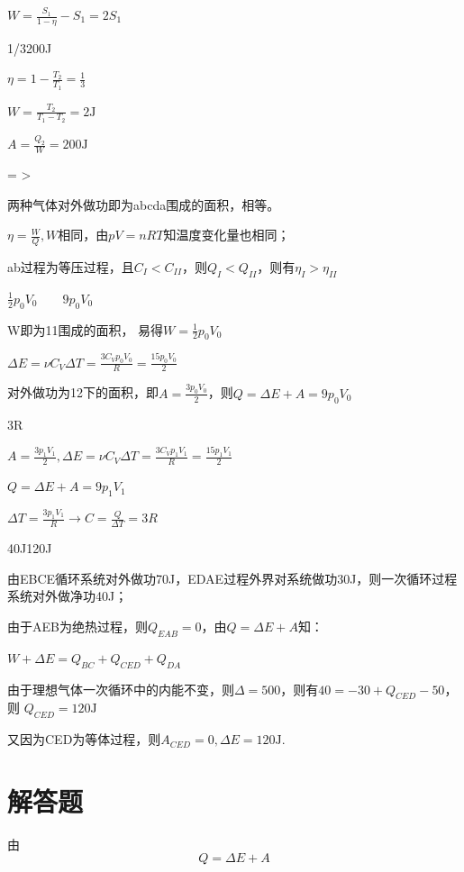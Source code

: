 \documentclass[b5paper,opensource]{./template/qyxf-book}
\begin{document}
$W=\frac{S_1}{1-\eta}-S_1=2S_1$

1/3\qquad200J

\solve
$\eta =1-\frac{T_2}{T_1}=\frac{1}{3}$

$W=\frac{T_2}{T_1-T_2}=2\mathrm{J}$

$A=\frac{Q_2}{W}=200\mathrm{J}$

= \qquad >

\solve 两种气体对外做功即为abcda围成的面积，相等。

$\eta=\frac{W}{Q},W$相同，由$pV=nRT$知温度变化量也相同；

ab过程为等压过程，且$C_{I}<C_{II}$，则$Q_{I}<Q_{II}$，则有$\eta_I>\eta_{II}$

$\frac{1}{2}p_0V_0\qquad 9p_0V_0$

\solve W即为1\to1围成的面积， 易得$W=\frac{1}{2}p_0V_0$

$\Delta E=\nu C_V\Delta T=\frac{3C_Vp_0V_0}{R}=\frac{15p_0V_0}{2}$

对外做功为1\to2下的面积，即$A=\frac{3p_0V_0}{2}$，则$Q=\Delta E+A=9p_0V_0$

3R

\solve$A=\frac{3p_1V_1}{2}, \Delta E=\nu C_V\Delta T=\frac{3C_Vp_1V_1}{R}=\frac{15p_1V_1}{2}$

$Q=\Delta E+A=9p_1V_1$

$\Delta T=\frac{3p_1V_1}{R} \rightarrow C=\frac{Q}{\Delta T}=3R$

40J\qquad 120J

\solve 由EBCE循环系统对外做功70J，EDAE过程外界对系统做功30J，则一次循环过程系统对外做净功40J；

由于AEB为绝热过程，则$Q_{EAB}=0$，由$Q=\Delta E+A$知：

$W+\Delta E=Q_{BC}+Q_{CED}+Q_{DA}$

由于理想气体一次循环中的内能不变，则$\Delta=500$，则有$40=-30+Q_{CED}-50$，则
$Q_{CED}=120\mathrm{J}$

又因为CED为等体过程，则$A_{CED}=0,\Delta E=120\mathrm{J}$.

\section{解答题}


\solve 由\[Q = \Delta E + A\]
\end{document}
